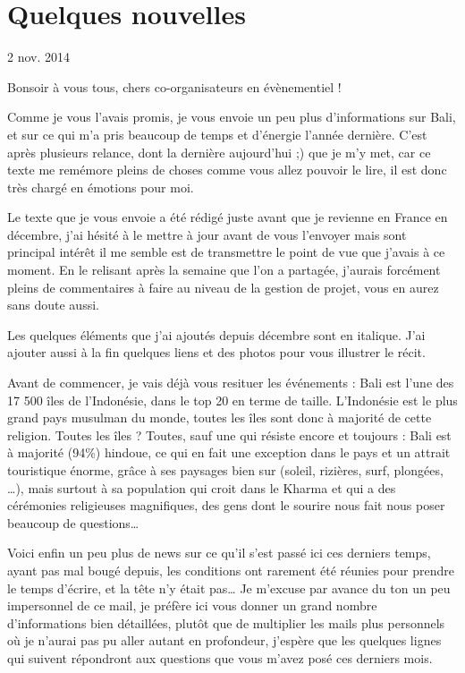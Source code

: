 \section{Quelques nouvelles}

2 nov. 2014


Bonsoir à vous tous, chers co-organisateurs en évènementiel !

Comme je vous l’avais promis, je vous envoie un peu plus d’informations sur Bali, et sur ce qui m’a pris beaucoup de temps et d’énergie l’année dernière. C’est après plusieurs relance, dont la dernière aujourd’hui ;) que je m’y met, car ce texte me remémore pleins de choses comme vous allez pouvoir le lire, il est donc très chargé en émotions pour moi.

Le texte que je vous envoie a été rédigé juste avant que je revienne en France en décembre, j’ai hésité à le mettre à jour avant de vous l'envoyer mais sont principal intérêt il me semble est de transmettre le point de vue que j’avais à ce moment. En le relisant après la semaine que l’on a partagée, j’aurais forcément pleins de commentaires à faire au niveau de la gestion de projet, vous en aurez sans doute aussi.

Les quelques éléments que j’ai ajoutés depuis décembre sont en italique. J’ai ajouter aussi à la fin quelques liens et des photos pour vous illustrer le récit.

Avant de commencer, je vais déjà vous resituer les événements : Bali est l’une des 17 500 îles de l’Indonésie, dans le top 20 en terme de taille. L’Indonésie est le plus grand pays musulman du monde, toutes les îles sont donc à majorité de cette religion. Toutes les îles ? Toutes, sauf une qui résiste encore et toujours : Bali est à majorité (94\%) hindoue, ce qui en fait une exception dans le pays et un attrait touristique énorme, grâce à ses paysages bien sur (soleil, rizières, surf, plongées, …), mais surtout à sa population qui croit dans le Kharma et qui a des cérémonies religieuses magnifiques, des gens dont le sourire nous fait nous poser beaucoup de questions…

Voici enfin un peu plus de news sur ce qu’il s’est passé ici ces derniers temps, ayant pas mal bougé depuis, les conditions ont rarement été réunies pour prendre le temps d’écrire, et la tête n’y était pas… Je m’excuse par avance du ton un peu impersonnel de ce mail, je préfère ici vous donner un grand nombre d’informations bien détaillées, plutôt que de multiplier les mails plus personnels où je n’aurai pas pu aller autant en profondeur, j’espère que les quelques lignes qui suivent répondront aux questions que vous m’avez posé ces derniers mois.

